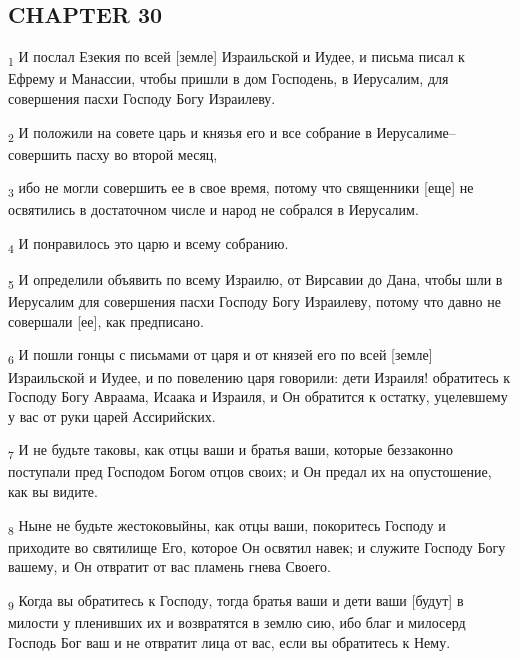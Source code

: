 \subsection{CHAPTER 30}
\begin{tcolorbox}
\textsubscript{1} И послал Езекия по всей [земле] Израильской и Иудее, и письма писал к Ефрему и Манассии, чтобы пришли в дом Господень, в Иерусалим, для совершения пасхи Господу Богу Израилеву.
\end{tcolorbox}
\begin{tcolorbox}
\textsubscript{2} И положили на совете царь и князья его и все собрание в Иерусалиме--совершить пасху во второй месяц,
\end{tcolorbox}
\begin{tcolorbox}
\textsubscript{3} ибо не могли совершить ее в свое время, потому что священники [еще] не освятились в достаточном числе и народ не собрался в Иерусалим.
\end{tcolorbox}
\begin{tcolorbox}
\textsubscript{4} И понравилось это царю и всему собранию.
\end{tcolorbox}
\begin{tcolorbox}
\textsubscript{5} И определили объявить по всему Израилю, от Вирсавии до Дана, чтобы шли в Иерусалим для совершения пасхи Господу Богу Израилеву, потому что давно не совершали [ее], как предписано.
\end{tcolorbox}
\begin{tcolorbox}
\textsubscript{6} И пошли гонцы с письмами от царя и от князей его по всей [земле] Израильской и Иудее, и по повелению царя говорили: дети Израиля! обратитесь к Господу Богу Авраама, Исаака и Израиля, и Он обратится к остатку, уцелевшему у вас от руки царей Ассирийских.
\end{tcolorbox}
\begin{tcolorbox}
\textsubscript{7} И не будьте таковы, как отцы ваши и братья ваши, которые беззаконно поступали пред Господом Богом отцов своих; и Он предал их на опустошение, как вы видите.
\end{tcolorbox}
\begin{tcolorbox}
\textsubscript{8} Ныне не будьте жестоковыйны, как отцы ваши, покоритесь Господу и приходите во святилище Его, которое Он освятил навек; и служите Господу Богу вашему, и Он отвратит от вас пламень гнева Своего.
\end{tcolorbox}
\begin{tcolorbox}
\textsubscript{9} Когда вы обратитесь к Господу, тогда братья ваши и дети ваши [будут] в милости у пленивших их и возвратятся в землю сию, ибо благ и милосерд Господь Бог ваш и не отвратит лица от вас, если вы обратитесь к Нему.
\end{tcolorbox}
